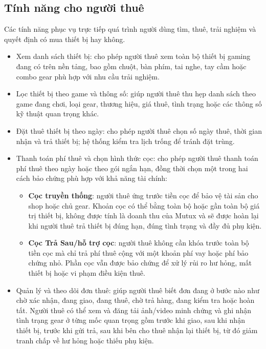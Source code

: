 \subsection{Tính năng cho người thuê}

Các tính năng phục vụ trực tiếp quá trình người dùng tìm, thuê, trải nghiệm và quyết định có mua thiết bị hay không.

\begin{itemize}
    \item Xem danh sách thiết bị: cho phép người thuê xem toàn bộ thiết bị gaming đang có trên nền tảng, bao gồm chuột, bàn phím, tai nghe, tay cầm hoặc combo gear phù hợp với nhu cầu trải nghiệm.
    \item Lọc thiết bị theo game và thông số: giúp người thuê thu hẹp danh sách theo game đang chơi, loại gear, thương hiệu, giá thuê, tình trạng hoặc các thông số kỹ thuật quan trọng khác.
    \item Đặt thuê thiết bị theo ngày: cho phép người thuê chọn số ngày thuê, thời gian nhận và trả thiết bị; hệ thống kiểm tra lịch trống để tránh đặt trùng.
    \item Thanh toán phí thuê và chọn hình thức cọc: cho phép người thuê thanh toán phí thuê theo ngày hoặc theo gói ngắn hạn, đồng thời chọn một trong hai cách bảo chứng phù hợp với khả năng tài chính:
    \begin{itemize}
        \item \textbf{Cọc truyền thống}: người thuê ứng trước tiền cọc để bảo vệ tài sản cho shop hoặc chủ gear. Khoản cọc có thể bằng toàn bộ hoặc gần toàn bộ giá trị thiết bị, không được tính là doanh thu của Mutux và sẽ được hoàn lại khi người thuê trả thiết bị đúng hạn, đúng tình trạng và đầy đủ phụ kiện.
        \item \textbf{Cọc Trả Sau/hỗ trợ cọc}: người thuê không cần khóa trước toàn bộ tiền cọc mà chỉ trả phí thuê cộng với một khoản phí vay hoặc phí bảo chứng nhỏ. Phần cọc vẫn được bảo chứng để xử lý rủi ro hư hỏng, mất thiết bị hoặc vi phạm điều kiện thuê.
    \end{itemize}
    \item Quản lý và theo dõi đơn thuê: giúp người thuê biết đơn đang ở bước nào như chờ xác nhận, đang giao, đang thuê, chờ trả hàng, đang kiểm tra hoặc hoàn tất. Người thuê có thể xem và đăng tải ảnh/video minh chứng và ghi nhận tình trạng gear ở từng mốc quan trọng gồm trước khi giao, sau khi nhận thiết bị, trước khi gửi trả, sau khi bên cho thuê nhận lại thiết bị, từ đó giảm tranh chấp về hư hỏng hoặc thiếu phụ kiện.

\end{itemize}
